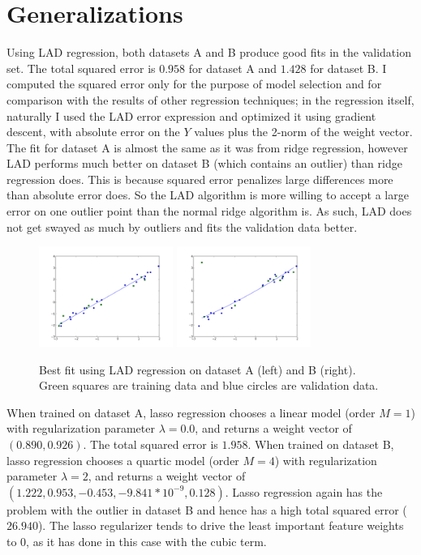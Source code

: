 \documentclass{paper}
\begin{document}
\section{Generalizations}

Using LAD regression, both datasets A and B produce good fits in the validation set. The total squared error is $0.958$ for dataset A and $1.428$ for dataset B. I computed the squared error only for the purpose of model selection and for comparison with the results of other regression techniques; in the regression itself, naturally I used the LAD error expression and optimized it using gradient descent, with absolute error on the $Y$ values plus the 2-norm of the weight vector. The fit for dataset A is almost the same as it was from ridge regression, however LAD performs much better on dataset B (which contains an outlier) than ridge regression does. This is because squared error penalizes large differences more than absolute error does. So the LAD algorithm is more willing to accept a large error on one outlier point than the normal ridge algorithm is. As such, LAD does not get swayed as much by outliers and fits the validation data better.

\begin{figure}
	\includegraphics[width=165px]{LAD-A-best-fit.png}
	\includegraphics[width=165px]{LAD-B-best-fit.png}
	\caption{Best fit using LAD regression on dataset A (left) and B (right). Green squares are training data and blue circles are validation data.}
\end{figure}

When trained on dataset A, lasso regression chooses a linear model (order $M = 1$) with regularization parameter $\lambda = 0.0$, and returns a weight vector of $(0.890,  0.926)$. The total squared error is $1.958$.
When trained on dataset B, lasso regression chooses a quartic model (order $M = 4$) with regularization parameter $\lambda = 2$, and returns a weight vector of $(1.222, 0.953,  -0.453, -9.841 * 10^{-9},   0.128)$. Lasso regression again has the problem with the outlier in dataset B and hence has a high total squared error ($26.940$). The lasso regularizer tends to drive the least important feature weights to 0, as it has done in this case with the cubic term. 
\end{document}
